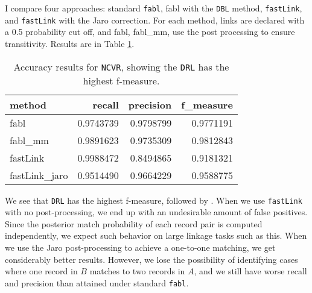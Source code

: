 \documentclass[12pt,letterpaper]{article}
\newcommand{\1}[1]{\mathbb{I}\!\left[#1\right]} %
\begin{document}
I compare four approaches: standard \texttt{fabl}, fabl with the \texttt{DBL} method, \texttt{fastLink}, and \texttt{fastLink} with the Jaro correction. For each method, links are declared with a 0.5 probability cut off, and fabl, fabl\_mm, use the post processing to ensure transitivity. Results are in Table \ref{table:ncvr_results}.

\begin{table}[t]
		\centering
\begin{tabular}{l|rrr}

	method & recall & precision & f\_measure\\
	\hline
	fabl & 0.9743739 & 0.9798799 & 0.9771191\\
	\hline
	fabl\_mm & 0.9891623 & 0.9735309 & 0.9812843\\
	\hline
	fastLink & 0.9988472 & 0.8494865 & 0.9181321\\
	\hline
	fastLink\_jaro & 0.9514490 & 0.9664229 & 0.9588775\\
\end{tabular}
\caption{Accuracy results for \texttt{NCVR}, showing the \texttt{DRL} has the highest f-measure.}
\label{table:ncvr_results}
\end{table}

We see that \texttt{DRL} has the highest f-measure, followed by . When we use \texttt{fastLink} with no post-processing, we end up with an undesirable amount of false positives. Since the posterior match probability of each record pair is computed independently, we expect such behavior on large linkage tasks such as this. When we use the Jaro post-processing to achieve a one-to-one matching, we get considerably better results. However, we lose the possibility of identifying cases where one record in $B$ matches to two records in $A$, and we still have worse recall and precision than attained under standard \texttt{fabl}.


\end{document}
